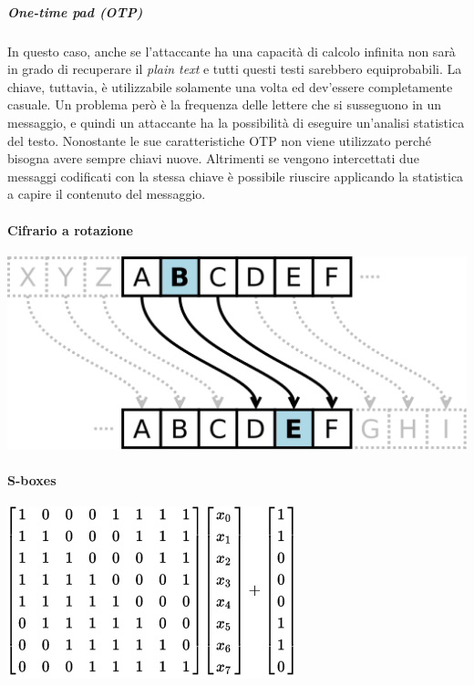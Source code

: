 \subparagraph*{One-time pad (OTP)}
In questo caso, anche se l'attaccante ha una capacità di calcolo infinita non 
sarà in grado di recuperare il \textit{plain text} e tutti questi testi 
sarebbero equiprobabili.
La chiave, tuttavia, è utilizzabile solamente una volta ed dev'essere 
completamente casuale.
Un problema però è la frequenza delle lettere che si susseguono in un messaggio, 
e quindi un attaccante ha la possibilità di eseguire un'analisi statistica del 
testo.
Nonostante le sue caratteristiche OTP non viene utilizzato perché bisogna avere 
sempre chiavi nuove. Altrimenti se vengono intercettati due messaggi codificati 
con la stessa chiave è possibile riuscire applicando la statistica a capire il 
contenuto del messaggio.

\paragraph{Cifrario a rotazione}

\begin{center}
  \includegraphics[scale=0.2]{res/img/caesar.png}
  \label{fig:password:caesar}
\end{center}


\paragraph{S-boxes}

\begin{center}
  \includegraphics[scale=0.5]{res/img/sboxes.png}
  \label{fig:password:sboxes}
\end{center}


